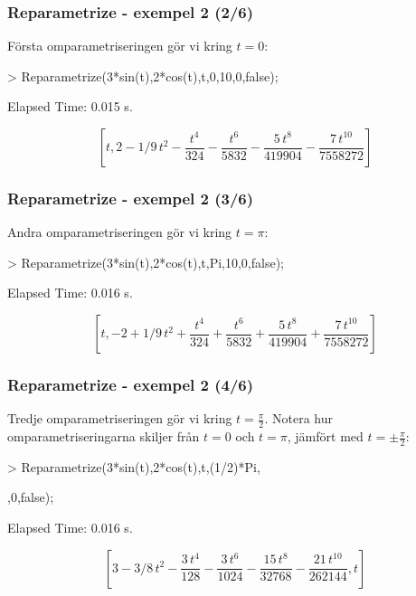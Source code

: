 \documentclass{beamer}
\begin{document}
  \begin{frame}
  	\frametitle{Reparametrize - exempel 2 (2/6)}
  	
  	\begin{example}
		Första omparametriseringen gör vi kring $t=0$:

		\begin{semiverbatim}
			> Reparametrize(3*sin(t),2*cos(t),t,0,10,0,false);
			
			
			Elapsed Time: 0.015 s.
		\end{semiverbatim}
		
		\[\left[t,2-1/9\,{t}^{2}-{\frac {{t}^{4}}{324}}-{\frac {{t}^{6}}{5832}}-{\frac {5\,{t}^{8}}{419904}}-{\frac {7\,{t}^{10}}{7558272}}\right]\]
	\end{example}
\end{frame}

\begin{frame}
	\frametitle{Reparametrize - exempel 2 (3/6)}
	
	\begin{example}
		Andra omparametriseringen gör vi kring $t=\pi$:
		
		\begin{semiverbatim}
			> Reparametrize(3*sin(t),2*cos(t),t,Pi,10,0,false);
			
			
			Elapsed Time: 0.016 s.
		\end{semiverbatim}
		
		\[\left[t,-2+1/9\,{t}^{2}+{\frac {{t}^{4}}{324}}+{\frac {{t}^{6}}{5832}}+{\frac {5\,{t}^{8}}{419904}}+{\frac {7\,{t}^{10}}{7558272}}\right]\]
	\end{example}
\end{frame}

\begin{frame}
	\frametitle{Reparametrize - exempel 2 (4/6)}
	
	\begin{example}
		Tredje omparametriseringen gör vi kring $t=\frac{\pi}{2}$. Notera hur omparametriseringarna skiljer från $t=0$ och $t=\pi$, jämfört med $t=\pm \frac{\pi}{2}:$
		
		\begin{semiverbatim}
			> Reparametrize(3*sin(t),2*cos(t),t,(1/2)*Pi,

			,0,false);
			
			
			Elapsed Time: 0.016 s.
		\end{semiverbatim}
		
		\[\left[3-3/8\,{t}^{2}-{\frac {3\,{t}^{4}}{128}}-{\frac {3\,{t}^{6}}{1024}}-{\frac {15\,{t}^{8}}{32768}}-{\frac {21\,{t}^{10}}{262144}},t\right]\]
	\end{example}
\end{frame}
\end{document}
